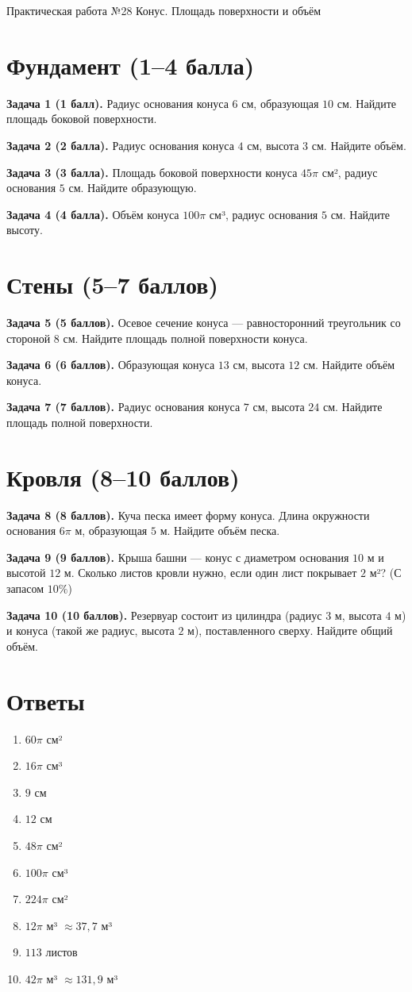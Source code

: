 \documentclass{umk-matematika}
\begin{document}
\maketitlepage
    {Практическая работа №28}
    {Конус. Площадь поверхности и объём}
    {}

\section{Фундамент (1--4 балла)}

\textbf{Задача 1 (1 балл).} Радиус основания конуса $6$ см, образующая $10$ см. Найдите площадь боковой поверхности.

\textbf{Задача 2 (2 балла).} Радиус основания конуса $4$ см, высота $3$ см. Найдите объём.

\textbf{Задача 3 (3 балла).} Площадь боковой поверхности конуса $45\pi$ см², радиус основания $5$ см. Найдите образующую.

\textbf{Задача 4 (4 балла).} Объём конуса $100\pi$ см³, радиус основания $5$ см. Найдите высоту.

\section{Стены (5--7 баллов)}

\textbf{Задача 5 (5 баллов).} Осевое сечение конуса — равносторонний треугольник со стороной $8$ см. Найдите площадь полной поверхности конуса.

\textbf{Задача 6 (6 баллов).} Образующая конуса $13$ см, высота $12$ см. Найдите объём конуса.

\textbf{Задача 7 (7 баллов).} Радиус основания конуса $7$ см, высота $24$ см. Найдите площадь полной поверхности.

\section{Кровля (8--10 баллов)}

\textbf{Задача 8 (8 баллов).} Куча песка имеет форму конуса. Длина окружности основания $6\pi$ м, образующая $5$ м. Найдите объём песка.

\textbf{Задача 9 (9 баллов).} Крыша башни — конус с диаметром основания $10$ м и высотой $12$ м. Сколько листов кровли нужно, если один лист покрывает $2$ м²? (С запасом $10\%$)

\textbf{Задача 10 (10 баллов).} Резервуар состоит из цилиндра (радиус $3$ м, высота $4$ м) и конуса (такой же радиус, высота $2$ м), поставленного сверху. Найдите общий объём.

\newpage
\section*{Ответы}

\begin{enumerate}
  \item $60\pi$ см²
  \item $16\pi$ см³
  \item $9$ см
  \item $12$ см
  \item $48\pi$ см²
  \item $100\pi$ см³
  \item $224\pi$ см²
  \item $12\pi$ м³ $\approx 37{,}7$ м³
  \item $113$ листов
  \item $42\pi$ м³ $\approx 131{,}9$ м³
\end{enumerate}
\end{document}
